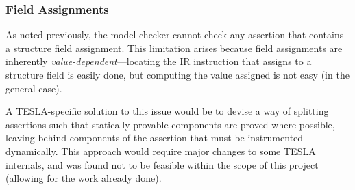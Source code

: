 \subsubsection{Field Assignments}

As noted previously, the model checker cannot check any assertion that
contains a structure field assignment. This limitation arises because
field assignments are inherently \emph{value-dependent}---locating the
IR instruction that assigns to a structure field is easily done, but
computing the value assigned is not easy (in the general case).

A TESLA-specific solution to this issue would be to devise a way of
splitting assertions such that statically provable components are proved
where possible, leaving behind components of the assertion that must be
instrumented dynamically. This approach would require major changes to
some TESLA internals, and was found not to be feasible within the scope
of this project (allowing for the work already done).
